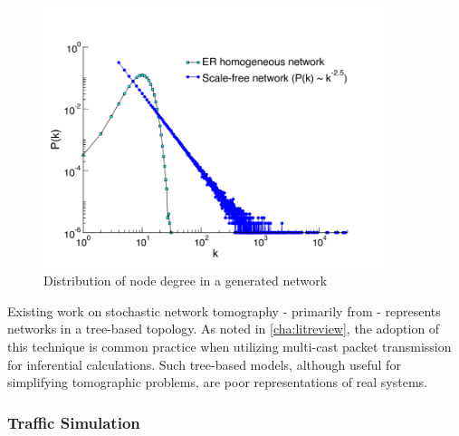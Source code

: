 \begin{figure}[t]
    \centering
    \includegraphics[width=10cm]{figs/intro/nodedegree-dist.png}
    \caption[Distribution of node degree in a generated network]{Distribution of node degree in a generated network \cite{baronchelli_networks_2013}}
    \label{fig:nddist}
\end{figure}
Existing work on stochastic network tomography - primarily from \cite{thoppe_stochastic_2014} \cite{kolar_distributed_2020} - represents networks in a tree-based topology. As noted in \cref{cha:litreview}, the adoption of this technique is common practice when utilizing multi-cast packet transmission for inferential calculations. Such tree-based models, although useful for simplifying tomographic problems, are poor representations of real systems.

\subsubsection*{Traffic Simulation}
\label{sssec:Itrafficsimulation}

